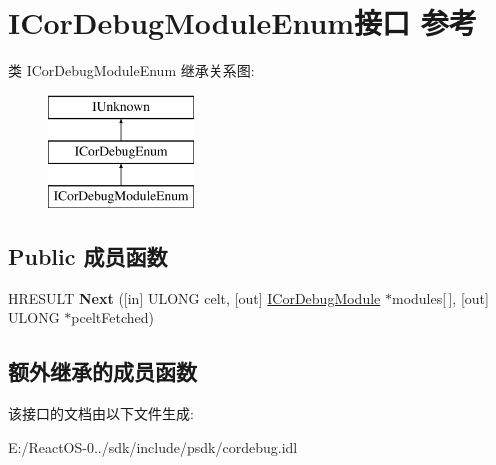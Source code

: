 \hypertarget{interface_i_cor_debug_module_enum}{}\section{I\+Cor\+Debug\+Module\+Enum接口 参考}
\label{interface_i_cor_debug_module_enum}
类 I\+Cor\+Debug\+Module\+Enum 继承关系图\+:\begin{figure}[H]
\begin{center}
\leavevmode
\includegraphics[height=3.000000cm]{interface_i_cor_debug_module_enum}
\end{center}
\end{figure}
\subsection*{Public 成员函数}
\begin{DoxyCompactItemize}
\item 
\mbox{\label{interface_i_cor_debug_module_enum_a082063b2385a6c31ffb7f60a47532d23}} 
H\+R\+E\+S\+U\+LT {\bfseries Next} (\mbox{[}in\mbox{]} U\+L\+O\+NG celt, \mbox{[}out\mbox{]} \hyperlink{interface_i_cor_debug_module}{I\+Cor\+Debug\+Module} $\ast$modules\mbox{[}$\,$\mbox{]}, \mbox{[}out\mbox{]} U\+L\+O\+NG $\ast$pcelt\+Fetched)
\end{DoxyCompactItemize}
\subsection*{额外继承的成员函数}


该接口的文档由以下文件生成\+:\begin{DoxyCompactItemize}
\item 
E\+:/\+React\+O\+S-\/0../sdk/include/psdk/cordebug.\+idl\end{DoxyCompactItemize}
